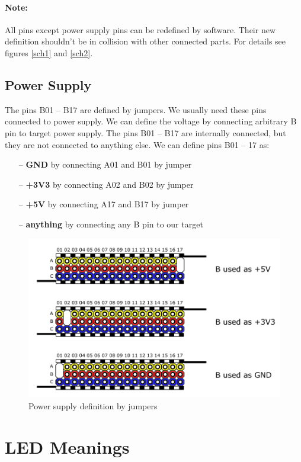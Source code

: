 \paragraph{Note:} All pins except power supply pins can be redefined by software. Their new definition shouldn't be in collision with other connected parts. For details see figures \ref{sch1} and \ref{sch2}.

\subsection{Power Supply}
\label{jumpersExternalPins}
The pins B01 -- B17 are defined by jumpers. We usually need these pins connected to power supply. We can define the voltage by connecting arbitrary B pin to target power supply. The pins B01 -- B17 are internally connected, but they are not connected to anything else. We can define pins B01 -- 17 as:
\begin{itemize}
	\setlength\itemsep{0.2em}
	\item[--] \textbf{GND} by connecting A01 and B01 by jumper
	\item[--] \textbf{+3V3} by connecting A02 and B02 by jumper
	\item[--] \textbf{+5V} by connecting A17 and B17 by jumper
	\item[--] \textbf{anything} by connecting any B pin to our target
\end{itemize}

\begin{figure}[H]
	\centering
	\includegraphics[scale=1]{img/jumpers.pdf}
	\caption{Power supply definition by jumpers}
	\label{fig:jumpersSupply}
\end{figure}

\section{LED Meanings}

